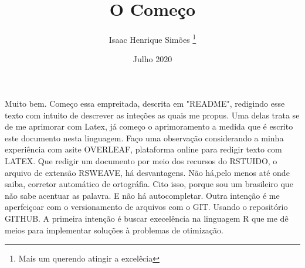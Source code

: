 \documentclass[12pt,twoside]{article}
\title{O Começo}
\author{Isaac Henrique Simões \thanks{Mais um querendo atingir a excelêcia}}
\date{Julho 2020}
\begin{document}


  \maketitle

Muito bem. Começo essa empreitada, descrita em "README", redigindo esse texto com intuito de descrever as inteções as quais me propus. Uma delas trata se de me aprimorar com Latex, já começo o aprimoramento a medida que é escrito este documento nesta linguagem. Faço uma observação considerando a minha experiência com asite OVERLEAF, plataforma online para redigir texto com LATEX. Que redigir um documento por meio dos recursos do RSTUIDO, o arquivo de extensão RSWEAVE, há  desvantagens. Não há,pelo menos até onde saiba, corretor automático de ortográfia. Cito isso, porque sou um brasileiro que não sabe acentuar as palavra. E não há autocompletar.
Outra intenção é me aperfeiçoar com o versionamento de arquivos com o GIT. Usando o repositório GITHUB. 
A primeira intenção é buscar execelência na linguagem R que me dê meios para implementar soluções à problemas de otimização.
\end{document}

